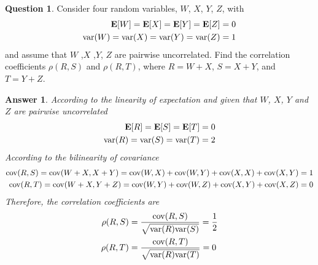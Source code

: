 \documentclass[utf8]{article}
\theoremstyle{definition}%
\newtheorem{question}{Question} %
\theoremstyle{plain}%
\newtheorem{answer}{Answer} %
\begin{document}
\begin{question}
    Consider four random variables, $W$, $X$, $Y$, $Z$, with
    \begin{equation}
    \begin{aligned}
        \mathbf{E}[W] = \mathbf{E}[X] = \mathbf{E}[Y] = \mathbf{E}[Z] = 0 \\
        \mathrm{var}(W) = \mathrm{var}(X) = \mathrm{var}(Y) = \mathrm{var}(Z) = 1 
    \end{aligned}
    \end{equation}
    and assume that $W$ ,$X$ ,$Y$, $Z$ are pairwise uncorrelated. Find the correlation coefficients $\rho(R, S)$ and $\rho(R, T)$, where $R = W + X$, $S = X + Y$, and $T = Y + Z$.
\end{question}
\begin{answer}
    According to the linearity of expectation and given that $W$, $X$, $Y$ and $Z$ are pairwise uncorrelated
    \begin{equation}
    \begin{aligned}
        \mathbf{E}[R] = \mathbf{E}[S] = \mathbf{E}[T] = 0 \\ 
        \mathrm{var}(R) = \mathrm{var}(S) = \mathrm{var}(T) = 2 
    \end{aligned}
    \end{equation}
    According to the bilinearity of covariance
    \begin{equation}
    \begin{aligned}
        \mathrm{cov}(R, S) = \mathrm{cov}(W + X, X + Y) = \mathrm{cov}(W, X) + \mathrm{cov}(W, Y) + \mathrm{cov}(X, X) + \mathrm{cov}(X, Y) = 1 \\
        \mathrm{cov}(R, T) = \mathrm{cov}(W + X, Y + Z) = \mathrm{cov}(W, Y) + \mathrm{cov}(W, Z) + \mathrm{cov}(X, Y) + \mathrm{cov}(X, Z) = 0
    \end{aligned}
    \end{equation}
    Therefore, the correlation coefficients are
    \begin{equation}
    \begin{aligned}
        \rho(R, S) &= \frac{\mathrm{cov}(R, S)}{\sqrt{\mathrm{var}(R) \mathrm{var}(S)}} = \frac{1}{2} \\
        \rho(R, T) &= \frac{\mathrm{cov}(R, T)}{\sqrt{\mathrm{var}(R) \mathrm{var}(T)}} = 0
    \end{aligned}
    \end{equation}
\end{answer}
\end{document}
